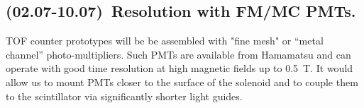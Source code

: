 \subsection{(02.07-10.07)~Resolution with FM/MC PMTs.}
 TOF counter prototypes  will be be assembled with  "fine mesh" or ``metal channel'' photo-multipliers.
 Such  PMTs are available from Hamamatsu and can  
operate with good time resolution at  high  magnetic fields up to 0.5~T.
 It  would allow us  to  mount PMTs closer to the surface of the solenoid and 
to couple them to the scintillator via significantly shorter light guides. 
